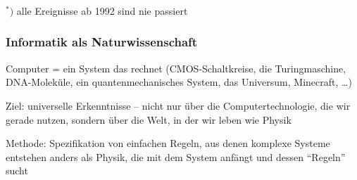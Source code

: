 \documentclass[onlymath]{beamer}
\begin{document}
\begin{frame}\frametitle{}

\pause
\begin{center}
{\huge{}}
\vspace{1cm}

\end{center}
\vspace{1cm}

$^*)$ alle Ereignisse ab 1992 sind nie passiert

\end{frame}

\begin{frame}\frametitle{Informatik als Naturwissenschaft}

\bigskip\pause

Computer = ein System das rechnet (CMOS-Schaltkreise, die Turingmaschine, DNA-Moleküle, ein quantenmechanisches System, das Universum, Minecraft, \ldots)
\bigskip

Ziel: universelle Erkenntnisse -- nicht nur über die Computertechnologie, die wir gerade nutzen, sondern über die Welt, in der wir leben  {\tiny wie Physik}
\bigskip

Methode: Spezifikation von einfachen Regeln, aus denen komplexe Systeme entstehen {\tiny anders als Physik, die mit dem System anfängt und dessen "`Regeln"' sucht}

\end{frame}
\end{document}

